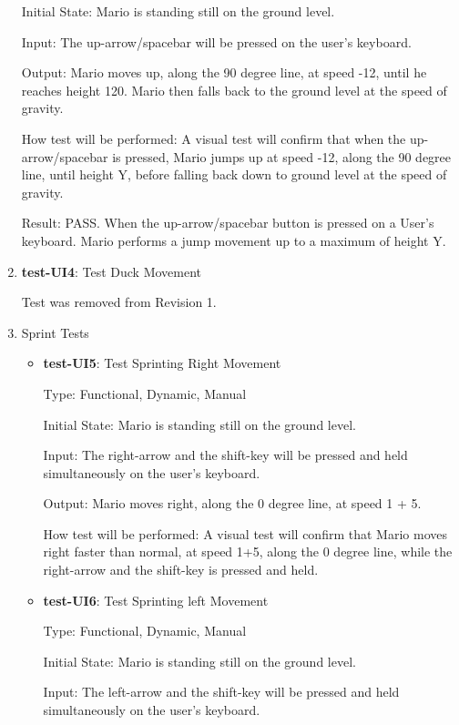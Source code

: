 \documentclass[12pt, titlepage]{article}
\begin{document}
\begin{enumerate}
Initial State: Mario is standing still on the ground level.
					
Input: The up-arrow/spacebar will be pressed on the user's keyboard.
					
Output: Mario moves up, along the 90 degree line, at speed -12, until he reaches height 120. Mario then falls back to the ground level at the speed of gravity.
					
How test will be performed: A visual test will confirm that when the up-arrow/spacebar is pressed, Mario jumps up at speed -12, along the 90 degree line, until height Y, before falling back down to ground level at the speed of gravity.

Result: PASS. When the up-arrow/spacebar button is pressed on a User's keyboard. Mario performs a jump movement up to a maximum of height Y.


\item{\textbf{test-UI4}: Test Duck Movement\\}

Test was removed from Revision 1.

\item Sprint Tests
\begin{itemize}
\item{\textbf{test-UI5}: Test Sprinting Right Movement\\}

Type: Functional, Dynamic, Manual
					
Initial State: Mario is standing still on the ground level.
					
Input: The right-arrow and the shift-key will be pressed and held simultaneously on the user's keyboard.
					
Output: Mario moves right, along the 0 degree line, at speed 1 + 5.
					
How test will be performed: A visual test will confirm that Mario moves right faster than normal, at speed 1+5, along the 0 degree line, while the right-arrow and the shift-key is pressed and held.


\item{\textbf{test-UI6}: Test Sprinting left Movement\\}

Type: Functional, Dynamic, Manual
					
Initial State: Mario is standing still on the ground level.
					
Input: The left-arrow and the shift-key will be pressed and held simultaneously on the user's keyboard.
					

\end{itemize}
\end{enumerate}
\end{document}
